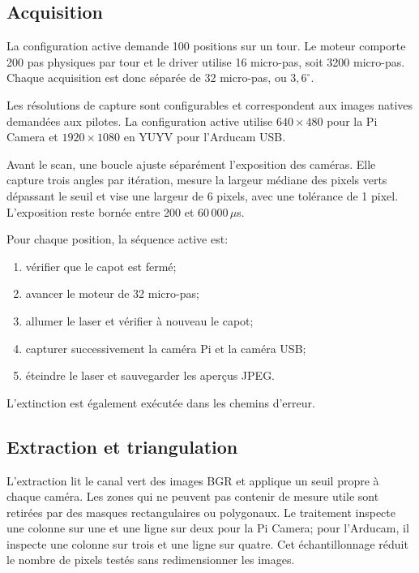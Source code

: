 \subsection{Acquisition}

La configuration active demande 100 positions sur un tour. Le moteur comporte
200 pas physiques par tour et le driver utilise 16 micro-pas, soit 3200
micro-pas. Chaque acquisition est donc séparée de 32 micro-pas, ou
$3{,}6^\circ$.

Les résolutions de capture sont configurables et correspondent aux images
natives demandées aux pilotes. La configuration active utilise
$640\times480$ pour la Pi Camera et $1920\times1080$ en YUYV pour l'Arducam
USB. 

Avant le scan, une boucle ajuste séparément l'exposition des caméras. Elle
capture trois angles par itération, mesure la largeur médiane des pixels verts
dépassant le seuil et vise une largeur de 6 pixels, avec une tolérance de
1 pixel. L'exposition reste bornée entre 200 et 60\,000\,$\mu$s.

Pour chaque position, la séquence active est:

\begin{enumerate}
  \item vérifier que le capot est fermé;
  \item avancer le moteur de 32 micro-pas;
  \item allumer le laser et vérifier à nouveau le capot;
  \item capturer successivement la caméra Pi et la caméra USB;
  \item éteindre le laser et sauvegarder les aperçus JPEG.
\end{enumerate}

L'extinction est également exécutée dans les chemins d'erreur.

\subsection{Extraction et triangulation}

L'extraction lit le canal vert des images BGR et applique un seuil propre à
chaque caméra. Les zones qui ne peuvent pas contenir de mesure utile sont
retirées par des masques rectangulaires ou polygonaux. Le traitement inspecte
une colonne sur une et une ligne sur deux pour la Pi Camera; pour l'Arducam, il
inspecte une colonne sur trois et une ligne sur quatre. Cet échantillonnage
réduit le nombre de pixels testés sans redimensionner les images.

